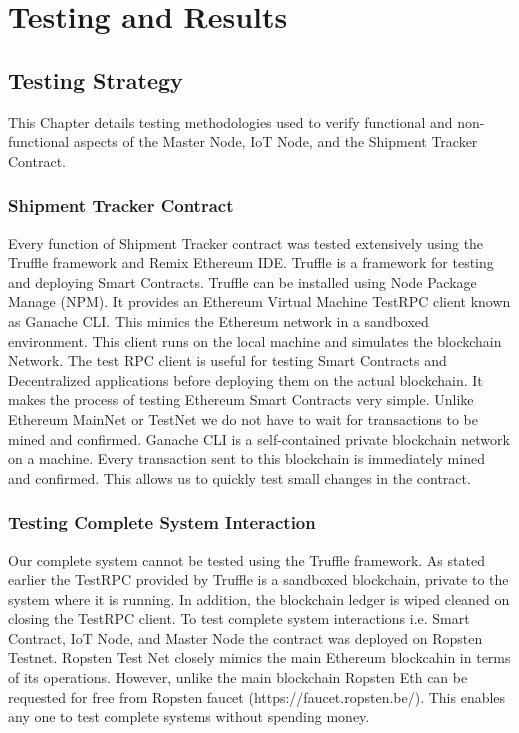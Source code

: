 \section{Testing and Results}

\subsection{Testing Strategy}
This Chapter details testing methodologies used to verify functional and non-functional aspects of the Master Node, IoT Node, and the Shipment Tracker Contract.
\subsubsection{Shipment Tracker Contract}
Every function of Shipment Tracker contract was tested extensively using the Truffle framework and Remix Ethereum IDE. Truffle is a framework for testing and deploying Smart Contracts. Truffle can be installed using Node Package Manage (NPM). It provides an Ethereum Virtual Machine TestRPC client known as Ganache CLI. This mimics the Ethereum network in a sandboxed environment. This client runs on the local machine and simulates the blockchain Network. The test RPC client is useful for testing Smart Contracts and Decentralized applications before deploying them on the actual blockchain.  It makes the process of testing Ethereum Smart Contracts very simple. Unlike Ethereum MainNet or TestNet we do not have to wait for transactions to be mined and confirmed. Ganache CLI is a self-contained private blockchain network on a machine. Every transaction sent to this blockchain is immediately mined and confirmed. This allows us to quickly test small changes in the contract.
\subsubsection{Testing Complete System Interaction}
Our complete system cannot be tested using the Truffle framework. As stated earlier the TestRPC provided by Truffle is a sandboxed blockchain, private to the system where it is running. In addition, the blockchain ledger is wiped cleaned on closing the TestRPC client. To test complete system interactions i.e. Smart Contract, IoT Node, and Master Node the contract was deployed on Ropsten Testnet. Ropsten Test Net closely mimics the main Ethereum blockcahin in terms of its operations. However, unlike the main blockchain Ropsten Eth can be requested for free from Ropsten faucet (https://faucet.ropsten.be/). This enables any one to test complete systems without spending money. 
